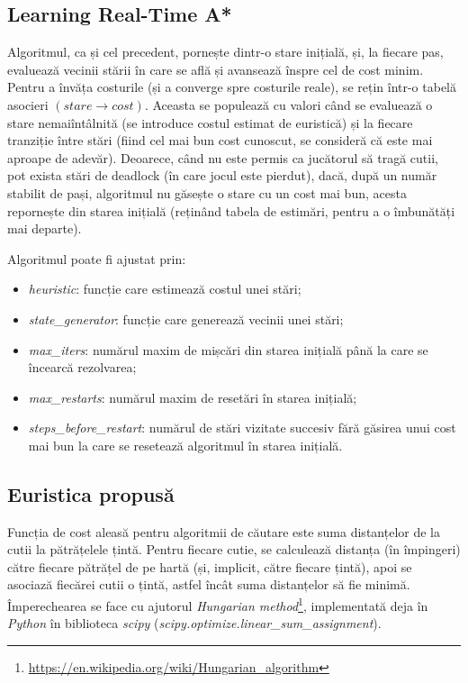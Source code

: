 \documentclass{article}
\begin{document}
\subsection{Learning Real-Time A*}
Algoritmul, ca și cel precedent, pornește dintr-o stare inițială, și, la fiecare
pas, evaluează vecinii stării în care se află și avansează înspre cel de cost 
minim. Pentru a învăța costurile (și a converge spre costurile reale), se rețin 
într-o tabelă asocieri $(stare \rightarrow cost)$. Aceasta se populează cu 
valori când se evaluează o stare nemaiîntâlnită (se introduce costul estimat de 
euristică) și la fiecare tranziție între stări (fiind cel mai bun cost cunoscut,
se consideră că este mai aproape de adevăr). Deoarece, când nu este permis ca
jucătorul să tragă cutii, pot exista stări de deadlock (în care jocul este 
pierdut), dacă, după un număr stabilit de pași, algoritmul nu găsește o stare cu
un cost mai bun, acesta repornește din starea inițială (reținând tabela de 
estimări, pentru a o îmbunătăți mai departe).

Algoritmul poate fi ajustat prin:
\begin{itemize}
    \item \textit{heuristic}: funcție care estimează costul unei stări;
    \item \textit{state\_generator}: funcție care generează vecinii unei stări;
    \item \textit{max\_iters}: numărul maxim de mișcări din starea inițială până
    la care se încearcă rezolvarea;
    \item \textit{max\_restarts}: numărul maxim de resetări în starea inițială;
    \item \textit{steps\_before\_restart}: numărul de stări vizitate succesiv 
    fără găsirea unui cost mai bun la care se resetează algoritmul în starea 
    inițială.
\end{itemize}

\subsection{Euristica propusă}

Funcția de cost aleasă pentru algoritmii de căutare este suma distanțelor de la
cutii la pătrățelele țintă. Pentru fiecare cutie, se calculează distanța 
(în împingeri) către fiecare pătrățel de pe hartă (și, implicit, către fiecare 
țintă), apoi se asociază fiecărei cutii o țintă, astfel încât suma distanțelor 
să fie minimă. Împerechearea se face cu ajutorul 
\textit{Hungarian method}\footnote{\url{https://en.wikipedia.org/wiki/Hungarian_algorithm}}, 
implementată deja în \textit{Python} în biblioteca \textit{scipy} 
(\textit{scipy.optimize.linear\_sum\_assignment}).
\end{document}
